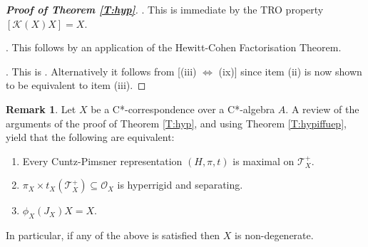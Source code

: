 \documentclass[11pt, draft]{amsart}
\numberwithin{equation}{section}
\theoremstyle{plain}
\theoremstyle{definition}
\newtheorem{remark}[theorem]{Remark}
\theoremstyle{remark}
\newcommand{\K}{{\mathcal{K}}}
\renewcommand{\O}{{\mathcal{O}}}
\newcommand{\T}{{\mathcal{T}}}
\begin{document}
\begin{proof}[{\bf Proof of Theorem \ref{T:hyp}}]
\medskip

. 
This is immediate by the TRO property $[\K(X) X] = X$.

\medskip

. 
This follows by an application of the Hewitt-Cohen Factorisation Theorem.

\medskip

\noindent
[(ii) $\Leftrightarrow$ (ix)]. 
This is \cite[Theorem 3.5]{Kim21}.
Alternatively it follows from [(iii) $\Leftrightarrow$ (ix)] since item (ii) is now shown to be equivalent to item (iii).
\end{proof}

\begin{remark} \label{R:septensor}
Let $X$ be a C*-correspondence over a C*-algebra $A$. A review of the arguments of the proof of Theorem \ref{T:hyp}, and using Theorem \ref{T:hypiffuep}, yield that the following are equivalent:
\begin{enumerate}
\item Every Cuntz-Pimsner representation $(H,\pi,t)$ is maximal on $\T_X^+$.
\item $\pi_X\times t_X(\T_X^+)\subseteq \O_X$ is hyperrigid and separating.
\item $\phi_X(J_X)X=X$.
\end{enumerate}
In particular, if any of the above is satisfied then $X$ is non-degenerate.
\end{remark}
\end{document}
